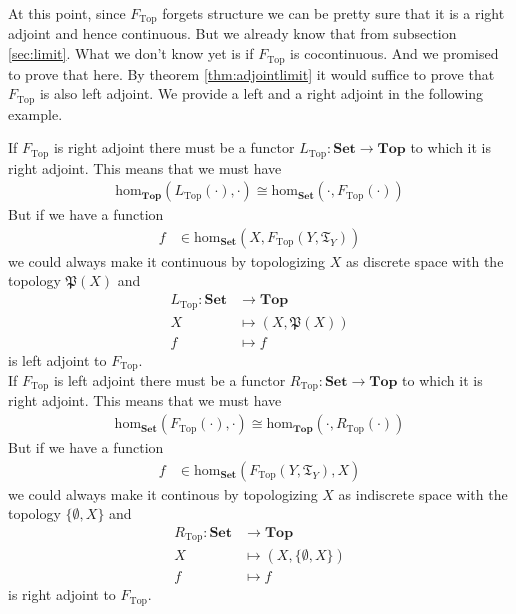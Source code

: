 At this point, since $F_{\mathrm{Top}}$ forgets structure we can be pretty sure that it is a right adjoint and hence continuous. But we already know that from subsection \ref{sec:limit}. What we don't know yet is if $F_{\mathrm{Top}}$ is cocontinuous. And we promised to prove that here. By theorem \ref{thm:adjointlimit} it would suffice to prove that $F_{\mathrm{Top}}$ is also left adjoint. We provide a left and a right adjoint in the following example.
\\
\begin{exa}
\label{exa:ftopadjoints}
If $F_{\mathrm{Top}}$ is right adjoint there must be a functor $L_{\mathrm{Top}} \colon \mathbf{Set} \rightarrow \mathbf{Top}$ to which it is right adjoint. This means that we must have
\begin{align*}
  \mathrm{hom}_{\mathbf{Top}}(L_{\mathrm{Top}}(\cdot),\cdot)
  \cong
  \mathrm{hom}_{\mathbf{Set}}(\cdot,F_{\mathrm{Top}}(\cdot))
\end{align*}
But if we have a function
\begin{align*}
  f
  &\in
  \mathrm{hom}_{\mathbf{Set}}(X,F_{\mathrm{Top}}(Y,\mathfrak{T}_{Y}))
\end{align*}
we could always make it continuous by topologizing $X$ as discrete space with the topology $\mathfrak{P}(X)$ and
\begin{align*}
  L_{\mathrm{Top}}
  \colon
  \mathbf{Set}
  &\rightarrow
  \mathbf{Top}
  \\
  X
  &\mapsto
  (X,\mathfrak{P}(X))
  \\
  f
  &\mapsto
  f
\end{align*}
is left adjoint to $F_{\mathrm{Top}}$.
\\
If $F_{\mathrm{Top}}$ is left adjoint there must be a functor $R_{\mathrm{Top}} \colon \mathbf{Set} \rightarrow \mathbf{Top}$ to which it is right adjoint. This means that we must have
\begin{align*}
  \mathrm{hom}_{\mathbf{Set}}(F_{\mathrm{Top}}(\cdot),\cdot)
  \cong
  \mathrm{hom}_{\mathbf{Top}}(\cdot,R_{\mathrm{Top}}(\cdot))
\end{align*}
But if we have a function
\begin{align*}
  f
  &\in
  \mathrm{hom}_{\mathbf{Set}}(F_{\mathrm{Top}}(Y,\mathfrak{T}_{Y}),X)
\end{align*}
we could always make it continous by topologizing $X$ as indiscrete space with the topology $\lbrace \emptyset,X \rbrace$ and
\begin{align*}
  R_{\mathrm{Top}}
  \colon
  \mathbf{Set}
  &\rightarrow
  \mathbf{Top}
  \\
  X
  &\mapsto
  (X,\lbrace \emptyset,X \rbrace)
  \\
  f
  &\mapsto
  f
\end{align*}
is right adjoint to $F_{\mathrm{Top}}$.
\end{exa}
